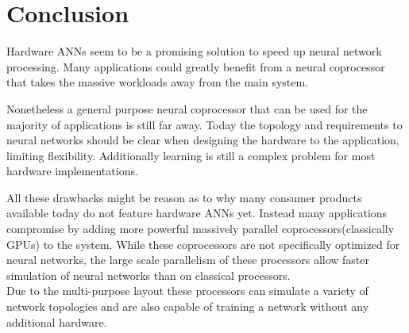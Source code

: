 \documentclass[conference]{IEEEtran}
\begin{document}
    \section{Conclusion}

    Hardware ANNs seem to be a promising solution to speed up neural network processing.
    Many applications could greatly benefit from a neural coprocessor that takes the massive workloads away from the main system.

    Nonetheless a general purpose neural coprocessor that can be used for the majority of applications is still far away.
    Today the topology and requirements to neural networks should be clear when designing the hardware to the application, limiting flexibility.
    Additionally learning is still a complex problem for most hardware implementations.

    All these drawbacks might be reason as to why many consumer products available today do not feature hardware ANNs yet.
    Instead many applications compromise by adding more powerful massively parallel coprocessors(classically GPUs) to the system.
    While these coprocessors are not specifically optimized for neural networks,
    the large scale parallelism of these processors allow faster simulation of neural networks than on classical processors.\\
    Due to the multi-purpose layout these processors can simulate a variety of network topologies and are also capable of training a network without any additional hardware.

    \medskip

    
    
\end{document}
